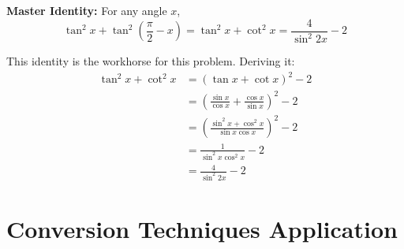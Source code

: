 \documentclass[12pt]{article}
\begin{document}
\begin{protip}
\textbf{Master Identity:} For any angle $x$,
\[\tan^2 x + \tan^2\left(\frac{\pi}{2}-x\right) = \tan^2 x + \cot^2 x = \frac{4}{\sin^2 2x} - 2\]

This identity is the workhorse for this problem. Deriving it:
\begin{align*}
\tan^2 x + \cot^2 x &= (\tan x + \cot x)^2 - 2 \\
&= \left(\frac{\sin x}{\cos x} + \frac{\cos x}{\sin x}\right)^2 - 2 \\
&= \left(\frac{\sin^2 x + \cos^2 x}{\sin x \cos x}\right)^2 - 2 \\
&= \frac{1}{\sin^2 x \cos^2 x} - 2 \\
&= \frac{4}{\sin^2 2x} - 2
\end{align*}
\end{protip}

\section{Conversion Techniques Application}
\end{document}
